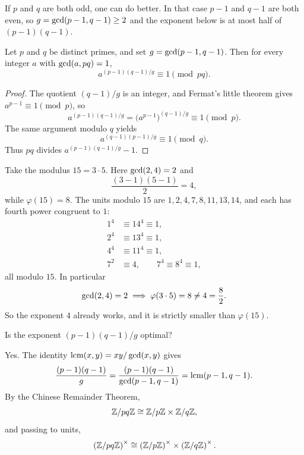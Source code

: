 
If \(p\) and \(q\) are both odd, one can do better. In that case \(p-1\) and \(q-1\) are both even, so \(g=\operatorname{gcd}(p-1,q-1)\ge 2\) and the exponent below is at most half of \((p-1)(q-1)\).

\begin{keybox}
\begin{theorem}
Let \(p\) and \(q\) be distinct primes, and set \(g=\operatorname{gcd}(p-1,q-1)\). Then for every integer \(a\) with \(\operatorname{gcd}(a,pq)=1\),
\[
    a^{(p-1)(q-1)/g}\equiv 1\pmod{pq}.
\]
\end{theorem}
\end{keybox}

\begin{proof}
The quotient \((q-1)/g\) is an integer, and Fermat's little theorem gives \(a^{p-1}\equiv 1\pmod{p}\), so
\[
    a^{(p-1)(q-1)/g}
    =\bigl(a^{p-1}\bigr)^{(q-1)/g}
    \equiv 1\pmod{p}.
\]
The same argument modulo \(q\) yields
\[
    a^{(q-1)(p-1)/g}\equiv 1\pmod{q}.
\]
Thus \(pq\) divides \(a^{(p-1)(q-1)/g}-1\).
\end{proof}

\begin{example}
Take the modulus \(15=3\cdot 5\). Here \(\operatorname{gcd}(2,4)=2\) and
\[
    \frac{(3-1)(5-1)}{2}=4,
\]
while \(\varphi(15)=8\). The units modulo \(15\) are \(1,2,4,7,8,11,13,14\), and each has fourth power congruent to \(1\):
\begin{align*}
    1^{4}&\equiv 14^{4}\equiv 1,\\
    2^{4}&\equiv 13^{4}\equiv 1,\\
    4^{4}&\equiv 11^{4}\equiv 1,\\
    7^{2}&\equiv 4,\qquad 7^{4}\equiv 8^{4}\equiv 1,
\end{align*}
all modulo \(15\).
In particular
\[
    \operatorname{gcd}(2,4)=2\implies \varphi(3\cdot 5)=8\neq 4=\frac{8}{2}.
\]
So the exponent \(4\) already works, and it is strictly smaller than \(\varphi(15)\).
\end{example}

Is the exponent \((p-1)(q-1)/g\) optimal?


Yes. The identity \(\operatorname{lcm}(x,y)=xy/\operatorname{gcd}(x,y)\) gives
\[
    \frac{(p-1)(q-1)}{g}
    =\frac{(p-1)(q-1)}{\operatorname{gcd}(p-1,q-1)}
    =\operatorname{lcm}(p-1,q-1).
\]
By the Chinese Remainder Theorem,
\[
    \mathbb Z/pq\mathbb Z\cong \mathbb Z/p\mathbb Z\times\mathbb Z/q\mathbb Z,
\]
and passing to units,
\[
    \left(\mathbb Z/pq\mathbb Z\right)^\times\cong \left(\mathbb Z/p\mathbb Z\right)^\times\times\left(\mathbb Z/q\mathbb Z\right)^\times.
\]


